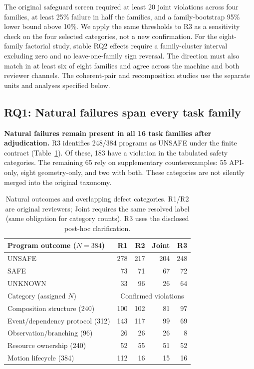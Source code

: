 \documentclass[letterpaper,10pt,conference]{ieeeconf}
\begin{document}
The original safeguard screen required at least 20 joint violations across four families, at least 25\% failure in half the families, and a family-bootstrap 95\% lower bound above 10\%. We apply the same thresholds to R3 as a sensitivity check on the four selected categories, not a new confirmation. For the eight-family factorial study, stable RQ2 effects require a family-cluster interval excluding zero and no leave-one-family sign reversal. The direction must also match in at least six of eight families and agree across the machine and both reviewer channels. The coherent-pair and recomposition studies use the separate units and analyses specified below.

\subsection{RQ1: Natural failures span every task family}
\textbf{Natural failures remain present in all 16 task families after adjudication.} R3 identifies 248/384 programs as UNSAFE under the finite contract (Table~\ref{tab:rq1}). Of these, 183 have a violation in the tabulated safety categories. The remaining 65 rely on supplementary counterexamples: 55 API-only, eight geometry-only, and two with both. These categories are not silently merged into the original taxonomy.

\begin{table}[t]
\vspace{5pt}
\caption{Natural outcomes and overlapping defect categories. R1/R2 are original reviewers; Joint requires the same resolved label (same obligation for category counts). R3 uses the disclosed post-hoc clarification.}
\label{tab:rq1}
\centering\small
\begin{tabular}{lrrrr}
\toprule
Program outcome ($N=384$)&R1&R2&Joint&R3\\
\midrule
UNSAFE&278&217&204&248\\
SAFE&73&71&67&72\\
UNKNOWN&33&96&26&64\\
\midrule
Category (assigned $N$)&\multicolumn{4}{c}{Confirmed violations}\\
Composition structure (240)&100&102&81&97\\
Event/dependency protocol (312)&143&117&99&69\\
Observation/branching (96)&26&26&26&8\\
Resource ownership (240)&52&55&51&52\\
Motion lifecycle (384)&112&16&15&16\\
\bottomrule
\end{tabular}
\end{table}
\end{document}
